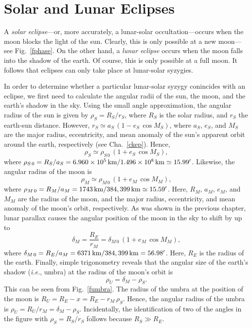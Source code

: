 \section{Solar and Lunar Eclipses}
A {\em solar eclipse}---or, more accurately, a lunar-solar occultation---occurs
when the moon blocks the light of the sun. Clearly, this is
only possible at a new moon---see Fig.~\ref{fphase}. On the other hand,
a {\em lunar eclipse}\/ occurs when the moon falls into the
shadow of the earth. Of course, this is only possible at a full moon. It follows that eclipses
can only take place at  lunar-solar syzygies.

In order to determine whether a particular lunar-solar syzygy conincides with an eclipse, we first need to calculate the angular radii of the
sun, the moon, and the earth's shadow in the sky. Using the small angle approximation, the
angular radius of the  sun is given by $\rho_S = R_S/r_S$, where
$R_S$ is the solar radius, and $r_S$ the earth-sun distance. However,
$r_S\simeq a_S\,(1-e_S\,\cos M_S)$, where $a_S$, $e_S$, and $M_S$
are the major radius, eccentricity, and mean anomaly of the sun's apparent
orbit around the earth, respectively (see Cha.~\ref{ckep}). Hence,
\begin{equation}
\rho_S \simeq \rho_{S\,0}\,(1+e_S\,\cos M_S),
\end{equation}
where $\rho_{S\,0}=R_S/a_S=6.960\times10^5\,{\rm km}/1.496\times 10^8\,{\rm km}\simeq 15.99'$.
Likewise, the angular radius of the moon is
\begin{equation}
\rho_M\simeq  \rho_{M\,0}\,(1+e_M\,\cos M_M),
\end{equation}
where $\rho_{M\,0} = R_M/a_M =1743\,{\rm km}/384,399\,{\rm km}\simeq 15.59'$. Here,
$R_M$, $a_M$, $e_M$, and $M_M$ are the radius of the moon, and the major radius, eccentricity, and mean anomaly of the moon's orbit, respectively.
As was shown in the previous chapter, lunar parallax causes the
angular position of the moon in the sky to shift by up to
\begin{equation}
\delta_M = \frac{R_E}{r_M}= \delta_{M\,0}\,(1+e_M\,\cos M_M),
\end{equation}
where $\delta_{M\,0} = R_E/a_M = 6371\,{\rm km}/384,399\,{\rm km}=56.98'$. Here, $R_E$ is the
radius of the earth. Finally, simple trigonometry reveals that
the angular size of the earth's shadow ({\em i.e.}, umbra) at the radius of the moon's orbit is
\begin{equation}
\rho_U = \delta_M-\rho_S.
\end{equation}
This can be seen from Fig.~\ref{fumbra}.
The radius of the umbra at the position of the moon is $R_U = R_E-x=
R_E - r_M\,\rho_S$. Hence, the angular radius of the umbra is
$\rho_U = R_U/r_M = \delta_M-\rho_S$. Incidentally,
the identification of two of the angles in the figure with $\rho_S=R_S/r_S$ follows
because $R_S\gg R_E$.

